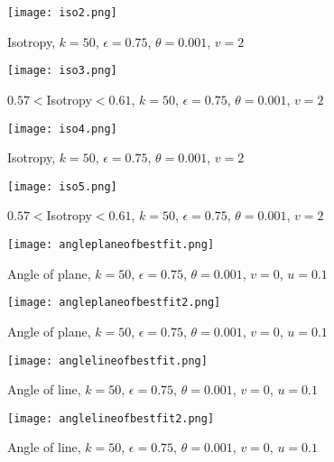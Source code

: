 \documentclass[a4paper,11pt,twoside]{article}
\theoremstyle{definition}
\theoremstyle{remark}
\begin{document}
\newpage
\begin{figure}[!h]
  \caption{Isotropy, $k=50$, $\epsilon = 0.75$, $\theta = 0.001$, $v=2$}
  \centering
    \texttt{[image: iso2.png]}
    \label{iso2}
\end{figure}
\begin{figure}[!h]
  \caption{$0.57<$Isotropy$<0.61$, $k=50$, $\epsilon = 0.75$, $\theta = 0.001$, $v=2$}
  \centering
    \texttt{[image: iso3.png]}
    \label{iso3}
\end{figure}
\newpage
\begin{figure}[!h]
  \caption{Isotropy, $k=50$, $\epsilon = 0.75$, $\theta = 0.001$, $v=2$}
  \centering
    \texttt{[image: iso4.png]}
    \label{iso4}
\end{figure}
\begin{figure}[!h]
  \caption{$0.57<$Isotropy$<0.61$, $k=50$, $\epsilon = 0.75$, $\theta = 0.001$, $v=2$}
  \centering
    \texttt{[image: iso5.png]}
    \label{iso5}
\end{figure}
\newpage
\begin{figure}[!h]
  \caption{Angle of plane, $k=50$, $\epsilon = 0.75$, $\theta = 0.001$, $v=0$, $u=0.1$}
  \centering
    \texttt{[image: angleplaneofbestfit.png]}
    \label{apb1}
\end{figure}
\begin{figure}[!h]
  \caption{Angle of plane, $k=50$, $\epsilon = 0.75$, $\theta = 0.001$, $v=0$, $u=0.1$}
  \centering
    \texttt{[image: angleplaneofbestfit2.png]}
    \label{apb2}
\end{figure}
\newpage
\begin{figure}[!h]
  \caption{Angle of line, $k=50$, $\epsilon = 0.75$, $\theta = 0.001$, $v=0$, $u=0.1$}
  \centering
    \texttt{[image: anglelineofbestfit.png]}
    \label{alb1}
\end{figure}
\begin{figure}[!h]
  \caption{Angle of line, $k=50$, $\epsilon = 0.75$, $\theta = 0.001$, $v=0$, $u=0.1$}
  \centering
    \texttt{[image: anglelineofbestfit2.png]}
    \label{alb2}
\end{figure}
\newpage
\end{document}

